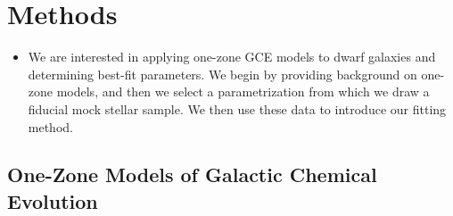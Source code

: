 \documentclass[ms.tex]{subfiles}
\begin{document}
\section{Methods}
\label{sec:methods}

\begin{itemize}

	\item We are interested in applying one-zone GCE models to dwarf galaxies
	and determining best-fit parameters.
	We begin by providing background on one-zone models, and then we select
	a parametrization from which we draw a fiducial mock stellar sample.
	We then use these data to introduce our fitting method.

\end{itemize}

\subsection{One-Zone Models of Galactic Chemical Evolution}
\label{sec:methods:onezone}
\end{document}
